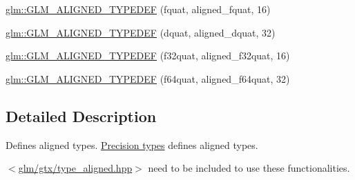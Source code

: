 \begin{DoxyCompactItemize}
\item 
\hyperlink{group__gtx__type__aligned_gad8c4bfacff70e57dc8303634c8bfce35}{glm\-::\-G\-L\-M\-\_\-\-A\-L\-I\-G\-N\-E\-D\-\_\-\-T\-Y\-P\-E\-D\-E\-F} (fquat, aligned\-\_\-fquat, 16)
\item 
\hyperlink{group__gtx__type__aligned_gaabc28c84a3288b697605d4688686f9a9}{glm\-::\-G\-L\-M\-\_\-\-A\-L\-I\-G\-N\-E\-D\-\_\-\-T\-Y\-P\-E\-D\-E\-F} (dquat, aligned\-\_\-dquat, 32)
\item 
\hyperlink{group__gtx__type__aligned_ga1ed8aeb5ca67fade269a46105f1bf273}{glm\-::\-G\-L\-M\-\_\-\-A\-L\-I\-G\-N\-E\-D\-\_\-\-T\-Y\-P\-E\-D\-E\-F} (f32quat, aligned\-\_\-f32quat, 16)
\item 
\hyperlink{group__gtx__type__aligned_ga95cc03b8b475993fa50e05e38e203303}{glm\-::\-G\-L\-M\-\_\-\-A\-L\-I\-G\-N\-E\-D\-\_\-\-T\-Y\-P\-E\-D\-E\-F} (f64quat, aligned\-\_\-f64quat, 32)
\end{DoxyCompactItemize}


\subsection{Detailed Description}
Defines aligned types. \hyperlink{group__core__precision}{Precision types} defines aligned types.

$<$\hyperlink{type__aligned_8hpp}{glm/gtx/type\-\_\-aligned.\-hpp}$>$ need to be included to use these functionalities. 

